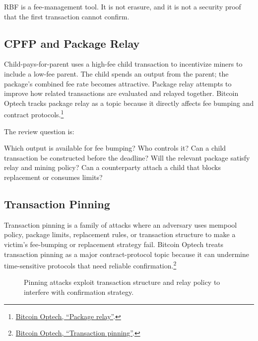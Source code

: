 RBF is a fee-management tool. It is not erasure, and it is not a security proof that the first transaction cannot confirm.

\subsection{CPFP and Package Relay}

Child-pays-for-parent uses a high-fee child transaction to incentivize miners to include a low-fee parent. The child spends an output from the parent; the package's combined fee rate becomes attractive. Package relay attempts to improve how related transactions are evaluated and relayed together. Bitcoin Optech tracks package relay as a topic because it directly affects fee bumping and contract protocols.\footnote{\href{https://bitcoinops.org/en/topics/package-relay/}{Bitcoin Optech, ``Package relay''}.}

The review question is:

\begin{codeblock}
Which output is available for fee bumping?
Who controls it?
Can a child transaction be constructed before the deadline?
Will the relevant package satisfy relay and mining policy?
Can a counterparty attach a child that blocks replacement or consumes limits?
\end{codeblock}

\subsection{Transaction Pinning}

Transaction pinning is a family of attacks where an adversary uses mempool policy, package limits, replacement rules, or transaction structure to make a victim's fee-bumping or replacement strategy fail. Bitcoin Optech treats transaction pinning as a major contract-protocol topic because it can undermine time-sensitive protocols that need reliable confirmation.\footnote{\href{https://bitcoinops.org/en/topics/transaction-pinning/}{Bitcoin Optech, ``Transaction pinning''}.}

\begin{figure}[htbp]
\centering
{}
\caption{Pinning attacks exploit transaction structure and relay policy to interfere with confirmation strategy.}
\end{figure}

